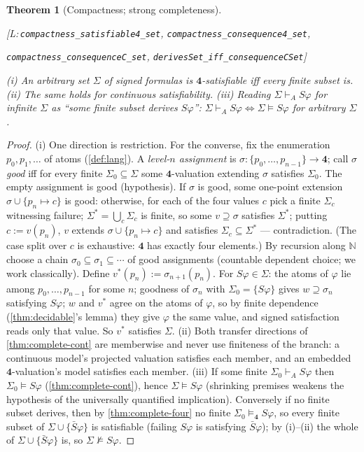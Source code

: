 \documentclass[11pt,a4paper]{article}
\newtheorem{theorem}{Theorem}[section]
\theoremstyle{definition}
\newcommand{\FOUR}{\mathbf{4}}
\newcommand{\dershort}{\vdash_{\!A}}
\newcommand{\lean}[1]{\texttt{#1}}
\begin{document}
\begin{theorem}[Compactness; strong completeness]\label{thm:compactness}
\mbox{}\par\noindent
\textnormal{\small [L:\,\lean{compactness\_satisfiable4\_set},
\lean{compactness\_consequence4\_set},}\par\noindent
\textnormal{\small
\lean{compactness\_consequenceC\_set},
\lean{derivesSet\_iff\_consequenceCSet}]}\par\noindent
(i) An arbitrary set $\Sigma$ of signed formulas is $\FOUR$-satisfiable iff
every finite subset is. (ii) The same holds for continuous satisfiability.
(iii) Reading $\Sigma\dershort S\varphi$ for infinite $\Sigma$ as ``some
finite subset derives $S\varphi$'':
$\Sigma\dershort S\varphi \iff \Sigma\models S\varphi$ for arbitrary
$\Sigma$.
\end{theorem}
\begin{proof}
(i) One direction is restriction. For the converse, fix the enumeration
$p_0,p_1,\dots$ of atoms (\cref{def:lang}). A \emph{level-$n$ assignment}
is $\sigma:\{p_0,\dots,p_{n-1}\}\to\FOUR$; call $\sigma$ \emph{good} iff
for every finite $\Sigma_0\subseteq\Sigma$ some $\FOUR$-valuation extending
$\sigma$ satisfies $\Sigma_0$. The empty assignment is good (hypothesis).
If $\sigma$ is good, some one-point extension $\sigma\cup\{p_n\mapsto c\}$
is good: otherwise, for each of the four values $c$ pick a finite
$\Sigma_c$ witnessing failure; $\Sigma^*=\bigcup_c\Sigma_c$ is finite, so
some $v\supseteq\sigma$ satisfies $\Sigma^*$; putting $c:=v(p_n)$, $v$
extends $\sigma\cup\{p_n\mapsto c\}$ and satisfies
$\Sigma_c\subseteq\Sigma^*$ --- contradiction. (The case split over $c$ is
exhaustive: $\FOUR$ has exactly four elements.) By recursion along
$\mathbb{N}$ choose a chain $\sigma_0\subseteq\sigma_1\subseteq\cdots$ of
good assignments (countable dependent choice; we work classically). Define
$v^*(p_n):=\sigma_{n+1}(p_n)$. For $S\varphi\in\Sigma$: the atoms of
$\varphi$ lie among $p_0,\dots,p_{n-1}$ for some $n$; goodness of
$\sigma_n$ with $\Sigma_0=\{S\varphi\}$ gives $w\supseteq\sigma_n$
satisfying $S\varphi$; $w$ and $v^*$ agree on the atoms of $\varphi$, so
by finite dependence (\cref{thm:decidable}'s lemma) they give $\varphi$
the same value, and signed satisfaction reads only that value. So $v^*$
satisfies $\Sigma$.
(ii) Both transfer directions of \cref{thm:complete-cont} are memberwise
and never use finiteness of the branch: a continuous model's projected
valuation satisfies each member, and an embedded $\FOUR$-valuation's model
satisfies each member.
(iii) If some finite $\Sigma_0\dershort S\varphi$ then
$\Sigma_0\models S\varphi$ (\cref{thm:complete-cont}), hence
$\Sigma\models S\varphi$ (shrinking premises weakens the hypothesis of the
universally quantified implication). Conversely if no finite subset
derives, then by \cref{thm:complete-four} no finite
$\Sigma_0\models_{\FOUR}S\varphi$, so every finite subset of
$\Sigma\cup\{\bar S\varphi\}$ is satisfiable (failing $S\varphi$ is
satisfying $\bar S\varphi$); by (i)--(ii) the whole of
$\Sigma\cup\{\bar S\varphi\}$ is, so $\Sigma\not\models S\varphi$.
\end{proof}
\end{document}

